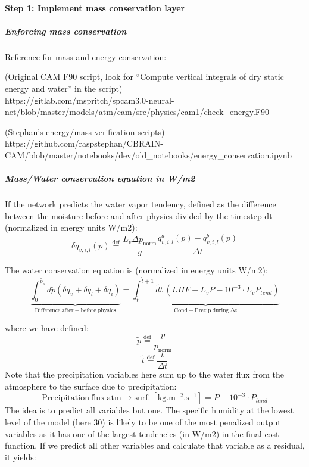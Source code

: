 \documentclass[11pt]{article}
\begin{document}
    \hypertarget{step-1-implement-mass-conservation-layer}{%
\paragraph{Step 1: Implement mass conservation
layer}\label{step-1-implement-mass-conservation-layer}}

    \hypertarget{enforcing-mass-conservation}{%
\subparagraph{Enforcing mass
conservation}\label{enforcing-mass-conservation}}

Reference for mass and energy conservation:

(Original CAM F90 script, look for ``Compute vertical integrals of dry
static energy and water'' in the script)\\
https://gitlab.com/mspritch/spcam3.0-neural-net/blob/master/models/atm/cam/src/physics/cam1/check\_energy.F90

(Stephan's energy/mass verification scripts)\\
https://github.com/raspstephan/CBRAIN-CAM/blob/master/notebooks/dev/old\_notebooks/energy\_conservation.ipynb

\hypertarget{masswater-conservation-equation-in-wm2}{%
\subparagraph{Mass/Water conservation equation in
W/m2}\label{masswater-conservation-equation-in-wm2}}

If the network predicts the water vapor tendency, defined as the
difference between the moisture before and after physics divided by the
timestep dt (normalized in energy units W/m2):
\[\delta q_{v,i,l}\left(p\right)\overset{\mathrm{def}}{=}\frac{L_{v}\Delta p_{\mathrm{norm}}}{g}\frac{q_{v,i,l}^{a}\left(p\right)-q_{v,i,l}^{b}\left(p\right)}{\Delta t}\]

The water conservation equation is (normalized in energy units W/m2):
\[\underbrace{\int_{0}^{\widetilde{p_{s}}}d\widetilde{p}\left(\delta q_{v}+\delta q_{l}+\delta q_{i}\right)}_{\mathrm{Difference\ after-before\ physics}}=\underbrace{\int_{\widetilde{t}}^{\widetilde{t}+1} \widetilde{dt}\ \left(LHF-L_{v}P-10^{-3}\cdot L_{v} P_{tend}\right)}_{\mathrm{Cond-Precip\ during\ \Delta t}}
\]

where we have defined: \[
\widetilde{p}\overset{\mathrm{def}}{=}\frac{p}{p_{\mathrm{norm}}}
\] \[
\widetilde{t}\overset{\mathrm{def}}{=}\frac{t}{\Delta t}
\] Note that the precipitation variables here sum up to the water flux
from the atmosphere to the surface due to precipitation: \[
\mathrm{Precipitation\ flux\ atm\rightarrow surf.\ \left[kg.m^{-2}.s^{-1}\right]}=P+10^{-3}\cdot P_{tend}
\] The idea is to predict all variables but one. The specific humidity
at the lowest level of the model (here 30) is likely to be one of the
most penalized output variables as it has one of the largest tendencies
(in W/m2) in the final cost function. If we predict all other variables
and calculate that variable as a residual, it yields:
\end{document}
